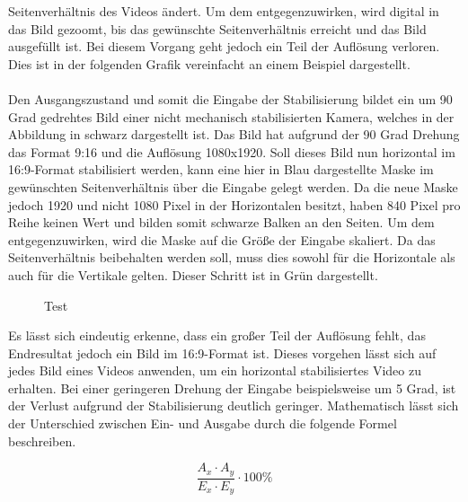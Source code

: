    Seitenverhältnis des Videos ändert. Um dem entgegenzuwirken, wird digital in das Bild gezoomt,
    bis das gewünschte Seitenverhältnis erreicht und das Bild ausgefüllt ist. Bei diesem Vorgang
    geht jedoch ein Teil der Auflösung verloren. Dies ist in der folgenden Grafik vereinfacht an
    einem Beispiel dargestellt. \\
    \\
    Den Ausgangszustand und somit die Eingabe der Stabilisierung bildet ein um 90 Grad gedrehtes
    Bild einer nicht mechanisch stabilisierten Kamera, welches in der Abbildung in schwarz dargestellt
    ist. Das Bild hat aufgrund der 90 Grad Drehung das Format 9:16 und die Auflösung 1080x1920. Soll
    dieses Bild nun horizontal im 16:9-Format stabilisiert werden, kann eine hier in Blau dargestellte
    Maske im gewünschten Seitenverhältnis über die Eingabe gelegt werden. Da die neue Maske jedoch 1920
    und nicht 1080 Pixel in der Horizontalen besitzt, haben 840 Pixel pro Reihe keinen Wert und bilden
    somit schwarze Balken an den Seiten. Um dem entgegenzuwirken, wird die Maske auf die Größe der
    Eingabe skaliert. Da das Seitenverhältnis beibehalten werden soll, muss dies sowohl für die
    Horizontale als auch für die Vertikale gelten. Dieser Schritt ist in Grün dargestellt.

    \begin{figure}[ht]
        \centering
        \def\svgwidth{\linewidth}
        
        \vspace{0.5cm}
        \caption{Test}
        \label{vektorgrafik}
    \end{figure}
    
    Es lässt sich eindeutig erkenne, dass ein großer Teil der Auflösung fehlt, das Endresultat jedoch
    ein Bild im 16:9-Format ist. Dieses vorgehen lässt sich auf jedes Bild eines Videos anwenden, um
    ein horizontal stabilisiertes Video zu erhalten. Bei einer geringeren Drehung der Eingabe beispielsweise
    um 5 Grad, ist der Verlust aufgrund der Stabilisierung deutlich geringer. Mathematisch lässt sich
    der Unterschied zwischen Ein- und Ausgabe durch die folgende Formel beschreiben.

    \begin{equation}
        \frac{A_x \cdot A_y}{E_x \cdot E_y} \cdot 100\%
    \end{equation}

